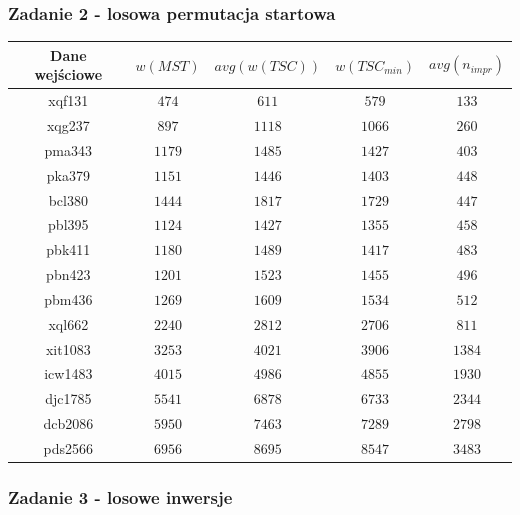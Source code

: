 \documentclass[12pt]{article}
\begin{document}
    \newpage

    \subsubsection*{Zadanie 2 - losowa permutacja startowa}

        \begin{table}[h!]
        \centering
        \begin{tabularx}{0.745\textwidth}{| c | c | c | c | c |}
            \hline
            Dane wejściowe & $w(MST)$ & $avg(w(TSC))$ & $w(TSC_{min})$ & $avg(n_{impr})$ \\
            \hline
            xqf131  & $474$  & $611$  & $579$  & $133$  \\
            xqg237  & $897$  & $1118$ & $1066$ & $260$  \\
            pma343  & $1179$ & $1485$ & $1427$ & $403$  \\
            pka379  & $1151$ & $1446$ & $1403$ & $448$  \\
            bcl380  & $1444$ & $1817$ & $1729$ & $447$  \\
            pbl395  & $1124$ & $1427$ & $1355$ & $458$  \\
            pbk411  & $1180$ & $1489$ & $1417$ & $483$  \\
            pbn423  & $1201$ & $1523$ & $1455$ & $496$  \\
            pbm436  & $1269$ & $1609$ & $1534$ & $512$  \\
            xql662  & $2240$ & $2812$ & $2706$ & $811$  \\
            xit1083 & $3253$ & $4021$ & $3906$ & $1384$ \\
            icw1483 & $4015$ & $4986$ & $4855$ & $1930$ \\
            djc1785 & $5541$ & $6878$ & $6733$ & $2344$ \\
            dcb2086 & $5950$ & $7463$ & $7289$ & $2798$ \\
            pds2566 & $6956$ & $8695$ & $8547$ & $3483$ \\
            \hline
        \end{tabularx}
        \label{table:ex2}
        \end{table}

    \subsubsection*{Zadanie 3 - losowe inwersje}
\end{document}
